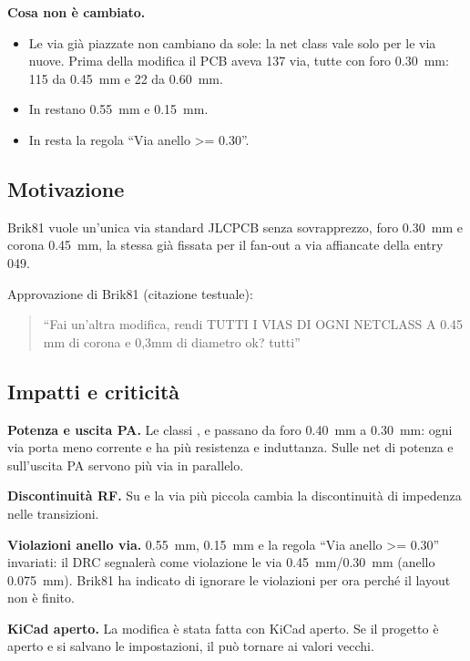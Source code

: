 \textbf{Cosa non è cambiato.}
\begin{itemize}
  \item Le via già piazzate non cambiano da sole: la net class vale solo per le via nuove. Prima della modifica il PCB aveva 137 via, tutte con foro \SI{0,30}{\milli\metre}: 115 da \SI{0,45}{\milli\metre} e 22 da \SI{0,60}{\milli\metre}.
  \item In  restano  \SI{0,55}{\milli\metre} e  \SI{0,15}{\milli\metre}.
  \item In  resta la regola ``Via anello >= 0.30''.
\end{itemize}

\subsection{Motivazione}
Brik81 vuole un'unica via standard JLCPCB senza sovrapprezzo, foro \SI{0,30}{\milli\metre} e corona \SI{0,45}{\milli\metre}, la stessa già fissata per il fan-out a via affiancate della entry 049.

Approvazione di Brik81 (citazione testuale):
\begin{quote}
``Fai un'altra modifica, rendi TUTTI I VIAS DI OGNI NETCLASS A 0.45 mm di corona e 0,3mm di diametro ok? tutti''
\end{quote}

\subsection{Impatti e criticità}
\begin{critbox}
\textbf{Potenza e uscita PA.} Le classi ,  e  passano da foro \SI{0,40}{\milli\metre} a \SI{0,30}{\milli\metre}: ogni via porta meno corrente e ha più resistenza e induttanza. Sulle net di potenza e sull'uscita PA servono più via in parallelo.
\end{critbox}
\begin{notebox}
\textbf{Discontinuità RF.} Su  e  la via più piccola cambia la discontinuità di impedenza nelle transizioni.
\end{notebox}
\begin{notebox}
\textbf{Violazioni anello via.}  \SI{0,55}{\milli\metre},  \SI{0,15}{\milli\metre} e la regola ``Via anello >= 0.30'' invariati: il DRC segnalerà come violazione le via \SI{0,45}{\milli\metre}/\SI{0,30}{\milli\metre} (anello \SI{0,075}{\milli\metre}). Brik81 ha indicato di ignorare le violazioni per ora perché il layout non è finito.
\end{notebox}
\begin{notebox}
\textbf{KiCad aperto.} La modifica è stata fatta con KiCad aperto. Se il progetto è aperto e si salvano le impostazioni, il  può tornare ai valori vecchi.
\end{notebox}

